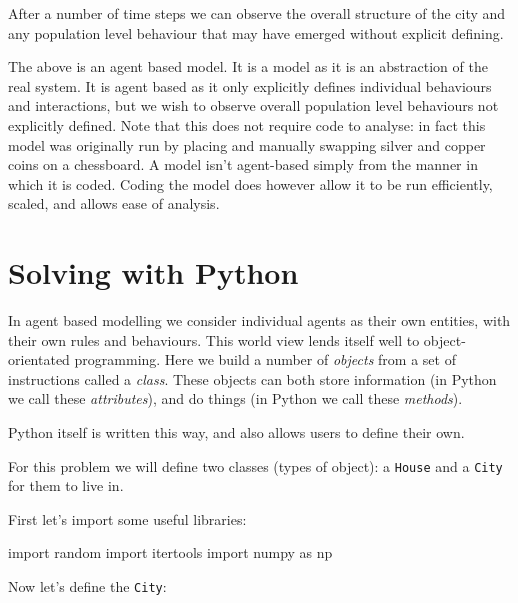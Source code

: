 After a number of time steps we can observe the overall structure of the city
and any population level behaviour that may have emerged without explicit
defining.

The above is an agent based model.
It is a model as it is an abstraction of the real system.
It is agent based as it only explicitly defines individual behaviours and
interactions, but we wish to observe overall population level behaviours not
explicitly defined.
Note that this does not require code to analyse: in fact this model was
originally run by placing and manually swapping silver and copper coins on a
chessboard.
A model isn't agent-based simply from the manner in which it is coded.
Coding the model does however allow it to be run efficiently, scaled, and allows
ease of analysis.


\section{Solving with Python}\label{sec:solving-with-python}
In agent based modelling we consider individual agents as their own entities,
with their own rules and behaviours.
This world view lends itself well to object-orientated programming.
Here we build a number of \textit{objects} from a set of instructions called a
\textit{class}.
These objects can both store information (in Python we call these
\textit{attributes}), and do things (in Python we call these \textit{methods}).

Python itself is written this way, and also allows users to define their own.

For this problem we will define two classes (types of object): a
\texttt{House} and a \texttt{City} for them to live in.

First let's import some useful libraries:

\begin{pyin}
import random
import itertools
import numpy as np
\end{pyin}

Now let's define the \texttt{City}:


